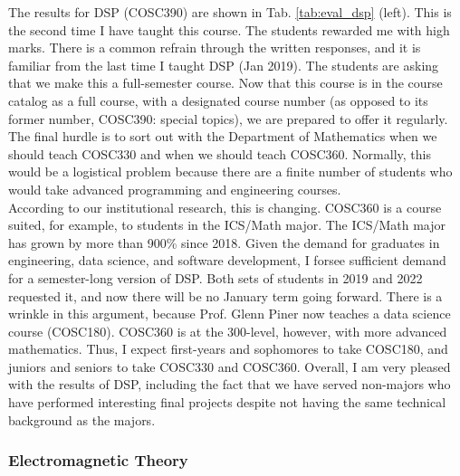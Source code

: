 \documentclass[../../main.tex]{subfiles}
\begin{document}
The results for DSP (COSC390) are shown in Tab. \ref{tab:eval_dsp} (left).  This is the second time I have taught this course.  The students rewarded me with high marks.  There is a common refrain through the written responses, and it is familiar from the last time I taught DSP (Jan 2019).  The students are asking that we make this a full-semester course.  Now that this course is in the course catalog as a full course, with a designated course number (as opposed to its former number, COSC390: special topics), we are prepared to offer it regularly.  The final hurdle is to sort out with the Department of Mathematics when we should teach COSC330 and when we should teach COSC360.  Normally, this would be a logistical problem because there are a finite number of students who would take advanced programming and engineering courses.
\\
\vspace{0.25cm}
According to our institutional research, this is changing.  COSC360 is a course suited, for example, to students in the ICS/Math major.  The ICS/Math major has grown by more than 900\% since 2018.  Given the demand for graduates in engineering, data science, and software development, I forsee sufficient demand for a semester-long version of DSP.  Both sets of students in 2019 and 2022 requested it, and now there will be no January term going forward.  There is a wrinkle in this argument, because Prof. Glenn Piner now teaches a data science course (COSC180).  COSC360 is at the 300-level, however, with more advanced mathematics.  Thus, I expect first-years and sophomores to take COSC180, and juniors and seniors to take COSC330 and COSC360.  Overall, I am very pleased with the results of DSP, including the fact that we have served non-majors who have performed interesting final projects despite not having the same technical background as the majors.

\subsubsection{Electromagnetic Theory}
\end{document}
